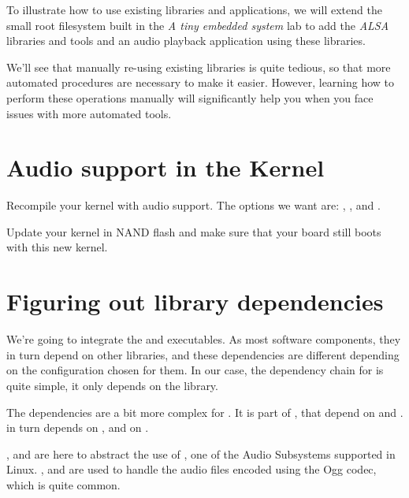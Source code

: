 
To illustrate how to use existing libraries and applications, we will
extend the small root filesystem built in the {\em A tiny embedded
  system} lab to add the {\em ALSA} libraries and tools and an audio
playback application using these libraries.

We'll see that manually re-using existing libraries is quite tedious,
so that more automated procedures are necessary to make it
easier. However, learning how to perform these operations manually
will significantly help you when you face issues with more
automated tools.

\section{Audio support in the Kernel}

Recompile your kernel with audio support. The options we want are:
, ,  and
.

Update your kernel in NAND flash and make sure that your board
still boots with this new kernel.

\section{Figuring out library dependencies}

We're going to integrate the  and 
executables. As most software components, they in turn depend
on other libraries, and these dependencies are different depending
on the configuration chosen for them. In our case, the dependency
chain for  is quite simple, it only depends on
the  library.

The dependencies are a bit more complex for . It is part
of , that depend on  and
.  in turn depends on , and
 on .

,  and  are here
to abstract the use of , one of the Audio Subsystems
supported in Linux. ,  and
 are used to handle the audio files encoded using the Ogg
codec, which is quite common.

